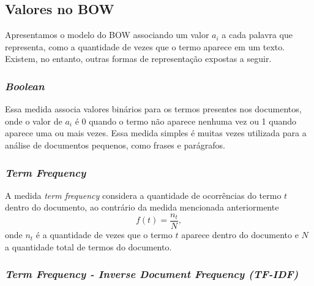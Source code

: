 \subsection{Valores no BOW}
\label{sec:representação_dos_termos}

Apresentamos o modelo do BOW associando um valor \(a_i\) a cada palavra que representa, como a quantidade de vezes que o termo aparece em um texto. Existem, no entanto, outras formas de representação expostas a seguir.

\subsubsection{\textit{Boolean}}
\label{ssub:bag-boolean}

Essa medida associa valores binários para os termos presentes nos documentos, onde o valor de \(a_{i}\) é 0 quando o termo não aparece nenhuma vez ou 1 quando aparece uma ou mais vezes. Essa medida simples é muitas vezes utilizada para a análise de documentos pequenos, como frases e parágrafos.

\subsubsection{\textit{Term Frequency}}
\label{ssub:baf-tf}

A medida \textit{term frequency} considera a quantidade de ocorrências do termo \(t\) dentro do documento, ao contrário da medida mencionada anteriormente \cite{buckley1988}
%
\begin{equation}
f(t)=\frac{n_t}{N},
\end{equation}
%
onde \(n_t\) é a quantidade de vezes que o termo \(t\) aparece dentro do documento e \(N\) a quantidade total de termos do documento.

\subsubsection{\textit{Term Frequency - Inverse Document Frequency (TF-IDF)}}
\label{ssub:baf-tfidf}

